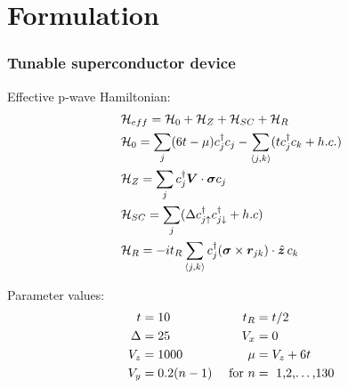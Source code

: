 \documentclass[xcolor=dvipsnames,10pt,aspectratio=169]{beamer}
\newcommand{\ham}{\mathcal{H}}
\newcommand{\FO}{Formulation}
\begin{document}
  \section{\FO}
  \begin{frame}
    \frametitle{Tunable superconductor device}

    \begin{multicols}{2}
      \begin{figure}
        \end{figure}

        \footnotesize
    Effective p-wave Hamiltonian:
    \begin{align}
      &\ham_{eff} = \ham_0 + \ham_Z + \ham_{SC} + \ham_R \notag\\
      &\ham_0 = \sum_j (6t - \mu) c_j^{\dagger} c_j -\sum_{\braket{j,k}} (t c_j^{\dagger} c_k + h.c.) \notag\\
      &\ham_Z = \sum_j c_j^{\dagger} \bm{V} \cdot \bm{\sigma} c_j \notag  \\
      &\ham_{SC} = \sum_j (\Delta c_{j\uparrow}^{\dagger} c_{j\downarrow}^{\dagger} + h.c) \notag \\
      &\ham_R = -it_R\sum_{\braket{j,k}}  c_j^{\dagger} (\bm{\sigma} \times \bm{r}_{jk}) \cdot \hat{\bm{z}} \, c_k \notag
    \end{align}

    Parameter values:
      \begin{align*}
        t &= 10 & t_R &= t/2 \\
        \Delta &= 25 & V_x &= 0 \\
        V_z &= 1000 & \mu &= V_z+6t \\
        V_y &= 0.2(n-1) & \text{ for } n &= \text{ 1,2,\dots,130}
      \end{align*}
      \vspace{-2.00em}
      \begin{equation*}
      \end{equation*}
    \end{multicols}

  \end{frame}
\end{document}
